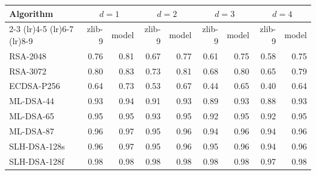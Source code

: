 \begin{tabular}{@{}lrrrrrrrr@{}}
\toprule
Algorithm & \multicolumn{2}{c}{$d=1$} & \multicolumn{2}{c}{$d=2$} & \multicolumn{2}{c}{$d=3$} & \multicolumn{2}{c}{$d=4$} \\
\cmidrule(lr){2-3} \cmidrule(lr){4-5} \cmidrule(lr){6-7} \cmidrule(lr){8-9}
 & zlib-9 & model & zlib-9 & model & zlib-9 & model & zlib-9 & model \\
\midrule
RSA-2048 & 0.76 & 0.81 & 0.67 & 0.77 & 0.61 & 0.75 & 0.58 & 0.75 \\
RSA-3072 & 0.80 & 0.83 & 0.73 & 0.81 & 0.68 & 0.80 & 0.65 & 0.79 \\
ECDSA-P256 & 0.64 & 0.73 & 0.53 & 0.67 & 0.44 & 0.65 & 0.40 & 0.64 \\
ML-DSA-44 & 0.93 & 0.94 & 0.91 & 0.93 & 0.89 & 0.93 & 0.88 & 0.93 \\
ML-DSA-65 & 0.95 & 0.95 & 0.93 & 0.95 & 0.92 & 0.95 & 0.92 & 0.95 \\
ML-DSA-87 & 0.96 & 0.97 & 0.95 & 0.96 & 0.94 & 0.96 & 0.94 & 0.96 \\
SLH-DSA-128s & 0.96 & 0.97 & 0.95 & 0.96 & 0.95 & 0.96 & 0.94 & 0.96 \\
SLH-DSA-128f & 0.98 & 0.98 & 0.98 & 0.98 & 0.98 & 0.98 & 0.97 & 0.98 \\
\bottomrule
\end{tabular}
